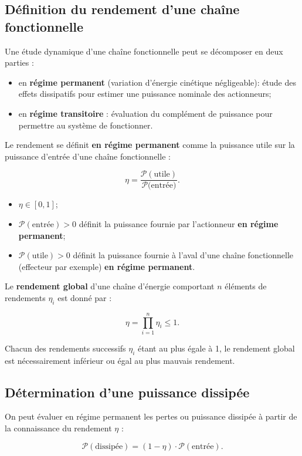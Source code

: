 \documentclass[10pt,fleqn]{article} %
\begin{document}
\subsection{Définition du rendement d'une chaîne fonctionnelle}

Une étude dynamique d'une chaîne fonctionnelle peut se décomposer en deux parties :
\begin{itemize}
\item en \textbf{régime permanent} (variation d'énergie cinétique négligeable): étude des effets dissipatifs pour estimer une puissance nominale des actionneurs;
\item en \textbf{régime transitoire} : évaluation du complément de puissance pour permettre au système de fonctionner.
\end{itemize} 

\begin{defi}
Le rendement se définit \textbf{en régime permanent} comme la puissance utile sur la puissance d'entrée d'une chaîne fonctionnelle : 

$$
\eta=\dfrac{\mathcal{P}(\text{utile})}{\mathcal{P}(\text{entrée)}}.
$$

\begin{itemize}
\item $\eta\in\left[0,1\right]$;
\item $\mathcal{P}(\text{entrée})>0$ définit la puissance fournie par l'actionneur \textbf{en régime permanent};
\item $\mathcal{P}(\text{utile})>0$ définit la puissance fournie à l'aval d'une chaîne fonctionnelle (effecteur par exemple) \textbf{en régime permanent}.
\end{itemize}
\end{defi}

\begin{prop}
Le \textbf{rendement global} d'une chaîne d'énergie comportant $n$ éléments de rendements $\eta_i$ est donné par : 

$$
\displaystyle{\eta=\prod_{i=1}^n\eta_i\leq 1}.
$$

Chacun des rendements successifs $\eta_i$ étant au plus égale à 1, le rendement global est nécessairement inférieur ou égal au plus mauvais rendement.
\end{prop}

\subsection{Détermination d'une puissance dissipée}

\begin{prop}
On peut évaluer en régime permanent les pertes ou puissance dissipée à partir de la connaissance du rendement $\eta$ : 

$$\mathcal{P}(\text{dissipée})=(1-\eta)\cdot \mathcal{P}(\text{entrée}).
$$


\end{prop}
\end{document}
